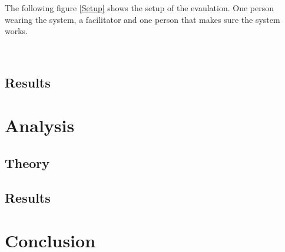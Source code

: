 The following figure \ref{Setup} shows the setup of the evaulation. One person wearing the system, a facilitator and one person that makes sure the system works. 

\begin{minipage}{\linewidth}%
\label{Setup}
\end{minipage}\\

\subsection{Results}


\section{Analysis}

\subsection{Theory}

\subsection{Results}


\section{Conclusion}
